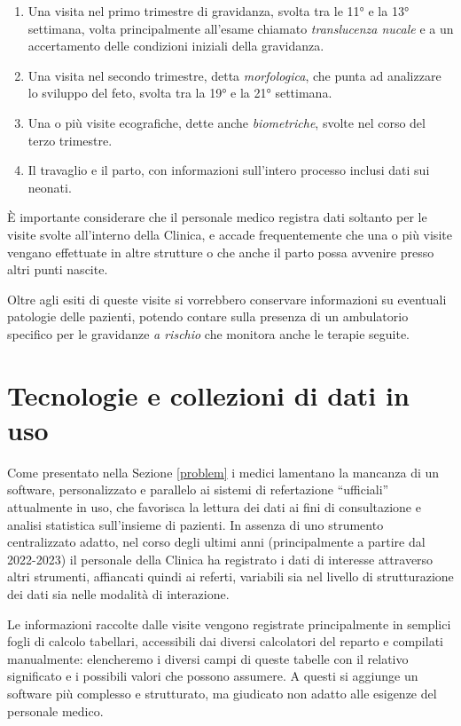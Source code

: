 \begin{enumerate}
\item Una visita nel primo trimestre di gravidanza, svolta tra le 11° e la 13° settimana, volta principalmente all'esame chiamato \emph{translucenza nucale} e a un accertamento delle condizioni iniziali della gravidanza.
\item Una visita nel secondo trimestre, detta \emph{morfologica}, che punta ad analizzare lo sviluppo del feto, svolta tra la 19° e la 21° settimana.
\item Una o più visite ecografiche, dette anche \emph{biometriche}, svolte nel corso del terzo trimestre.
\item Il travaglio e il parto, con informazioni sull'intero processo inclusi dati sui neonati.
\end{enumerate}

È importante considerare che il personale medico registra dati soltanto per le visite svolte all'interno della Clinica, e accade frequentemente che una o più visite vengano effettuate in altre strutture o che anche il parto possa avvenire presso altri punti nascite.

Oltre agli esiti di queste visite si vorrebbero conservare informazioni su eventuali patologie delle pazienti, potendo contare sulla presenza di un ambulatorio specifico per le gravidanze \emph{a rischio} che monitora anche le terapie seguite.

\section{Tecnologie e collezioni di dati in uso}
\label{usednow}

Come presentato nella Sezione \ref{problem} i medici lamentano la mancanza di un software, personalizzato e parallelo ai sistemi di refertazione \enquote{ufficiali} attualmente in uso, che favorisca la lettura dei dati ai fini di consultazione e analisi statistica sull'insieme di pazienti.
In assenza di uno strumento centralizzato adatto, nel corso degli ultimi anni (principalmente a partire dal 2022-2023) il personale della Clinica ha registrato i dati di interesse attraverso altri strumenti, affiancati quindi ai referti, variabili sia nel livello di strutturazione dei dati sia nelle modalità di interazione.

Le informazioni raccolte dalle visite vengono registrate principalmente in semplici fogli di calcolo tabellari, accessibili dai diversi calcolatori del reparto e compilati manualmente: elencheremo i diversi campi di queste tabelle con il relativo significato e i possibili valori che possono assumere.
A questi si aggiunge un software più complesso e strutturato, ma giudicato non adatto alle esigenze del personale medico.

